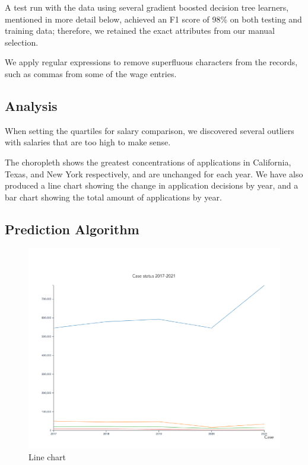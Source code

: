 \documentclass[sigconf]{acmart}
\begin{document}
A test run with the data using several gradient boosted decision tree learners, 
mentioned in more detail below, achieved an F1 score of 98\% on both testing 
and training data; therefore, we retained the exact attributes from our manual selection. 


We apply regular expressions to remove superfluous characters from the records, such as commas from some of the wage entries.  


\subsection{Analysis}
When setting the quartiles for salary comparison, we discovered several outliers with salaries that are too high to make sense. 

The choropleth shows the greatest concentrations of applications in 
California, Texas, and New York respectively, and are unchanged for each year. 
We have also produced a line chart showing the change in application decisions by year, and a bar chart showing the total 
amount of applications by year.

\subsection{Prediction Algorithm}


\begin{figure}
  \includegraphics[width=\linewidth]{fig2.png}
  \caption{Line chart}
  \label{fig:linechart}
\end{figure}
\end{document}
